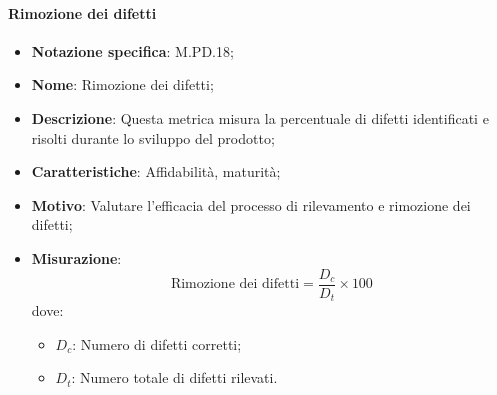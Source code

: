 \paragraph*{Rimozione dei difetti}
\begin{itemize}
    \item \textbf{Notazione specifica}: M.PD.18;
    \item \textbf{Nome}: Rimozione dei difetti;
    \item \textbf{Descrizione}: Questa metrica misura la percentuale di difetti identificati e risolti durante lo sviluppo del prodotto;
    \item \textbf{Caratteristiche}: Affidabilità, maturità;
    \item \textbf{Motivo}: Valutare l'efficacia del processo di rilevamento e rimozione dei difetti;
    \item \textbf{Misurazione}:
    \[
        \text{Rimozione dei difetti} = \frac{D_{c}}{D_{t}} \times 100
    \]
    dove:
    \begin{itemize}
        \item $D_{c}$: Numero di difetti corretti;
        \item $D_{t}$: Numero totale di difetti rilevati.
    \end{itemize}
\end{itemize}
